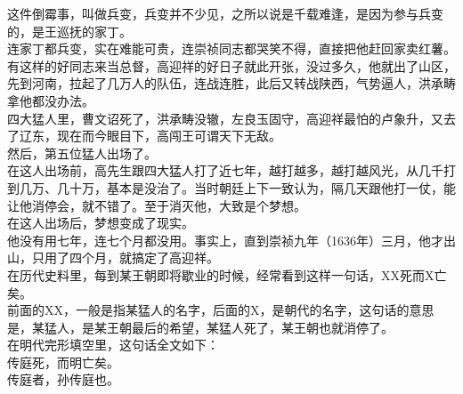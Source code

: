 \begin{multicols}{\theparacolNo}
这件倒霉事，叫做兵变，兵变并不少见，之所以说是千载难逢，是因为参与兵变的，是王巡抚的家丁。\\

连家丁都兵变，实在难能可贵，连崇祯同志都哭笑不得，直接把他赶回家卖红薯。\\

有这样的好同志来当总督，高迎祥的好日子就此开张，没过多久，他就出了山区，先到河南，拉起了几万人的队伍，连战连胜，此后又转战陕西，气势逼人，洪承畴拿他都没办法。\\

四大猛人里，曹文诏死了，洪承畴没辙，左良玉固守，高迎祥最怕的卢象升，又去了辽东，现在而今眼目下，高闯王可谓天下无敌。\\

然后，第五位猛人出场了。\\

在这人出场前，高先生跟四大猛人打了近七年，越打越多，越打越风光，从几千打到几万、几十万，基本是没治了。当时朝廷上下一致认为，隔几天跟他打一仗，能让他消停会，就不错了。至于消灭他，大致是个梦想。\\

在这人出场后，梦想变成了现实。\\

他没有用七年，连七个月都没用。事实上，直到崇祯九年（1636年）三月，他才出山，只用了四个月，就搞定了高迎祥。\\

在历代史料里，每到某王朝即将歇业的时候，经常看到这样一句话，XX死而X亡矣。\\

前面的XX，一般是指某猛人的名字，后面的X，是朝代的名字，这句话的意思是，某猛人，是某王朝最后的希望，某猛人死了，某王朝也就消停了。\\

在明代完形填空里，这句话全文如下：\\

传庭死，而明亡矣。\\

传庭者，孙传庭也。\\
\ifnum{}
	\end{multicols}
\fi
\newpage
